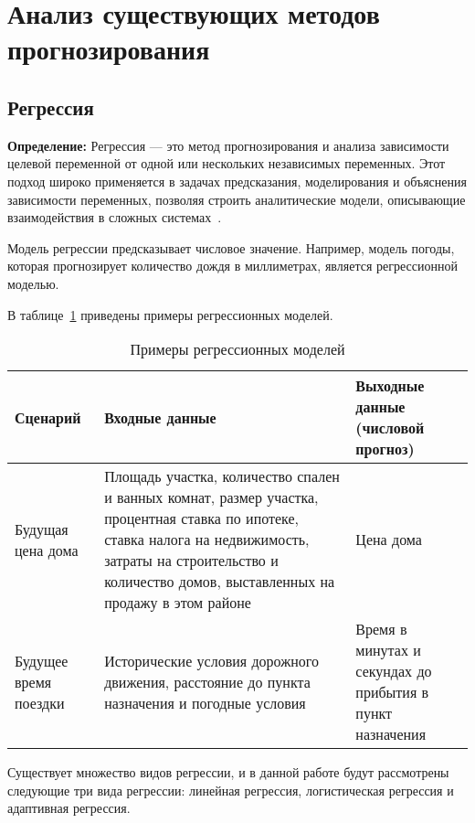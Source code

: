 \section{Анализ существующих методов прогнозирования}

\subsection{Регрессия}

\textbf{Определение:} Регрессия — это метод прогнозирования и анализа зависимости целевой переменной от одной или нескольких независимых переменных.
Этот подход широко применяется в задачах предсказания, моделирования и объяснения зависимости переменных, позволяя строить аналитические модели, описывающие взаимодействия в сложных системах~\cite{seber, montgomery}.

Модель регрессии предсказывает числовое значение.
Например, модель погоды, которая прогнозирует количество дождя в миллиметрах, является регрессионной моделью.

В таблице~\ref{tab:tabl1} приведены примеры регрессионных моделей.

\begin{table}[ht]
    \centering
    \caption{Примеры регрессионных моделей}
    \begin{tabularx}{\textwidth}{|>{\centering\arraybackslash}X|>{\centering\arraybackslash}X|>{\centering\arraybackslash}X|}
        \hline
        Сценарий & Входные данные & Выходные данные \newline(числовой прогноз) \\
        \hline
        Будущая цена дома & Площадь участка, количество спален и ванных комнат, размер участка, процентная ставка по ипотеке, ставка налога на недвижимость, затраты на строительство и количество домов, выставленных на продажу в этом районе & Цена дома \\
        \hline
        Будущее время поездки & Исторические условия дорожного движения, расстояние до пункта назначения и погодные условия & Время в минутах и секундах до прибытия в пункт назначения \\
        \hline
    \end{tabularx}
    \label{tab:tabl1}
\end{table}

Существует множество видов регрессии, и в данной работе будут рассмотрены следующие три вида регрессии: линейная регрессия, логистическая регрессия и адаптивная регрессия.

